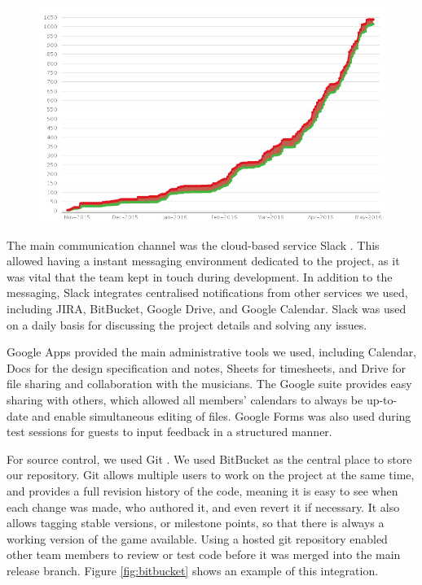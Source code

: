 \documentclass[a4paper,11pt]{article}
\begin{document}
\begin{figure}[ht]
	\centering
    \includegraphics[width=.75\textwidth]{jira_open_vs_closed}
    \label{fig:jira_open_closed}
\end{figure}

The main communication channel was the cloud-based service Slack \cite{slack}. This allowed having a instant messaging environment dedicated to the project, as it was vital that the team kept in touch during development. In addition to the messaging, Slack integrates centralised notifications from other services we used, including JIRA, BitBucket, Google Drive, and Google Calendar. Slack was used on a daily basis for discussing the project details and solving any issues.

Google Apps \cite{google_apps} provided the main administrative tools we used, including Calendar, Docs for the design specification and notes, Sheets for timesheets, and Drive for file sharing and collaboration with the 
musicians. The Google suite provides easy sharing with others, which allowed all members’ calendars to always be up-to-date and enable simultaneous editing of files. Google Forms was also used during test sessions for guests to input feedback in a structured manner.

For source control, we used Git \cite{git}. We used BitBucket \cite{bitbucket} as the central place to store our repository. Git allows multiple users to work on the project at the same time, and provides a full revision history of the code, meaning it is easy to see when each change was made, who authored it, and even revert it if necessary. It also allows tagging stable versions, or milestone points, so that there is always a working version of the game available. Using a hosted git repository enabled other team members to review or test code before it was merged into the main release branch. Figure \ref{fig:bitbucket} shows an example of this integration.
\end{document}
